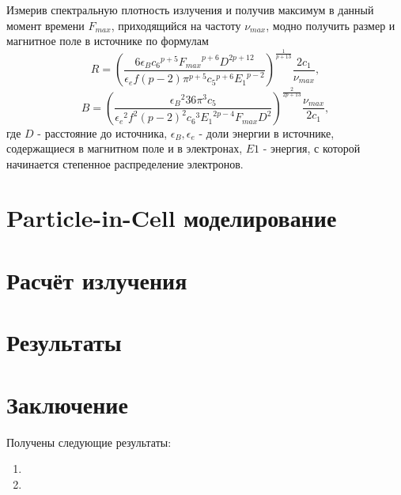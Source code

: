 Измерив спектральную плотность излучения и получив максимум в данный момент времени $F_{max}$, приходящийся на частоту $\nu_{max}$, модно получить размер и магнитное поле в источнике по формулам
\begin{equation}\label{ChevR}
R = {\left( \frac {6 \epsilon_B {c_6}^{p+5}{F_{max}}^{p+6}{
			D}^{2p+12}}{\epsilon_e f \left( p-2 \right) {\pi}^{p+5}{{c_5}}^{p+6}
		{E_1}^{p-2}} \right)} ^{ \frac{1}{p+13} } \frac{2 c_1}{\nu_{max}},
\end{equation}
\begin{equation}\label{ChevB}
B = { \left(\frac {{\epsilon_B}^2 36 {\pi}^{3}{c_5}}{{
			\epsilon_e}^{2}{f}^{2} \left( p-2 \right) ^{2}{{c_6}}^{3}{{E_1}}^{2 p-4}F_{max}{D}^{2}} \right)}
^{\frac{2}{2p+13}}\frac{\nu_{max}}{2 c_1},
\end{equation}
где $D$ - расстояние до источника, $\epsilon_B, \epsilon_e$ - доли энергии в источнике, содержащиеся в магнитном поле и в электронах, $E1$ - энергия, с которой начинается степенное распределение электронов.
\section{Particle-in-Cell моделирование }


\section{Расчёт излучения}




\section{Результаты}




\FloatBarrier
\section{Заключение}
 

Получены следующие результаты:
\begin{enumerate}
\item 
\item 
\end{enumerate}


\clearpage